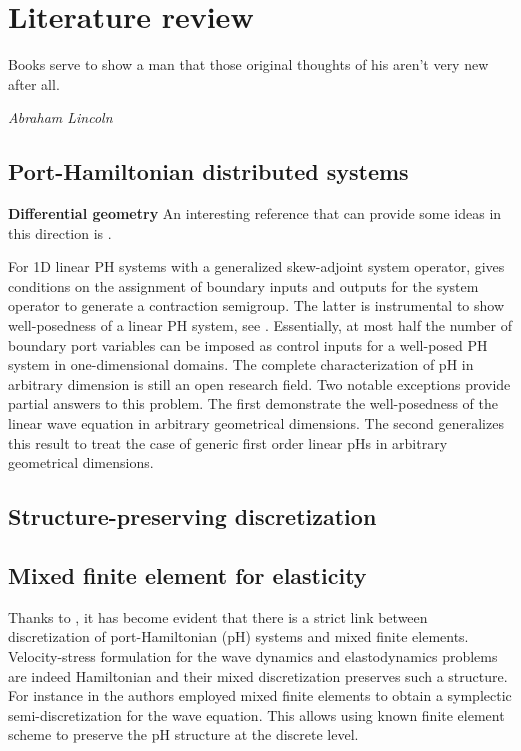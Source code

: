 \chapter[Literature review]{Literature review}

\epigraph{Books serve to show a man that those original thoughts of his aren't very new after all.}{\textit{Abraham Lincoln}}



\section{Port-Hamiltonian distributed systems}
\textbf{Differential geometry}
An interesting reference that can provide some ideas in this direction is \cite{yao2011modeling,nishida2004}. 

 For 1D linear PH systems with a generalized skew-adjoint system operator, \cite{legorrec2005} gives conditions on the assignment of boundary inputs and outputs for the system operator to generate a contraction semigroup. The latter is instrumental to show well-posedness of a linear PH system, see \cite{zwart2012}. Essentially, at most half the number of boundary port variables
can be imposed as control inputs for a well-posed PH system in one-dimensional domains. The complete characterization of pH in arbitrary dimension is still an open research field. Two notable exceptions \cite{zwart2015wave,skrepek2019wellposedness} provide partial answers to this problem. The first demonstrate the well-posedness of the linear wave equation in arbitrary geometrical dimensions. The second generalizes this result to treat the case of generic first order linear pHs in arbitrary geometrical dimensions. \\


\section{Structure-preserving discretization}

\section{Mixed finite element for elasticity}

Thanks to \cite{cardoso2018pfem}, it has become evident that there is a strict link between  discretization of port-Hamiltonian (pH) systems and mixed finite elements. Velocity-stress formulation for the wave dynamics and elastodynamics problems are indeed Hamiltonian and their mixed discretization preserves such a structure. For instance in \cite{kirby2015} the authors employed mixed finite elements to obtain a  symplectic semi-discretization for the wave equation. This allows using known finite element scheme to preserve the pH structure at the discrete level.

